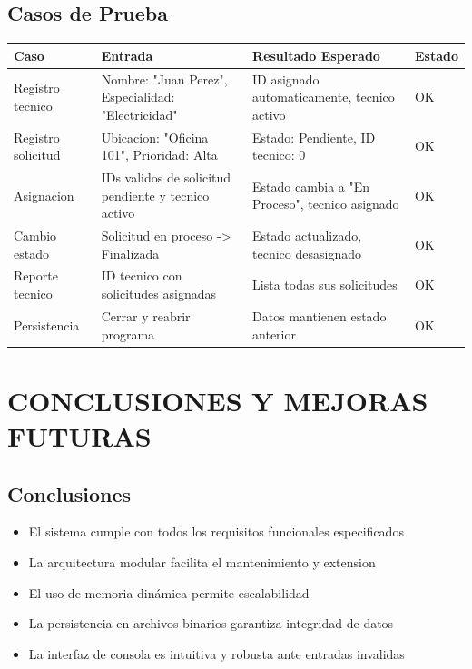 \documentclass[12pt, a4paper]{article}
\begin{document}
\subsection{Casos de Prueba}
\begin{tabular}{|p{3cm}|p{4cm}|p{4cm}|p{2cm}|}
\hline
\textbf{Caso} & \textbf{Entrada} & \textbf{Resultado Esperado} & \textbf{Estado} \\
\hline
Registro tecnico & Nombre: "Juan Perez", Especialidad: "Electricidad" & ID asignado automaticamente, tecnico activo & OK \\
\hline
Registro solicitud & Ubicacion: "Oficina 101", Prioridad: Alta & Estado: Pendiente, ID tecnico: 0 & OK \\
\hline
Asignacion & IDs validos de solicitud pendiente y tecnico activo & Estado cambia a "En Proceso", tecnico asignado & OK \\
\hline
Cambio estado & Solicitud en proceso -> Finalizada & Estado actualizado, tecnico desasignado & OK \\
\hline
Reporte tecnico & ID tecnico con solicitudes asignadas & Lista todas sus solicitudes & OK \\
\hline
Persistencia & Cerrar y reabrir programa & Datos mantienen estado anterior & OK \\
\hline
\end{tabular}

\section{CONCLUSIONES Y MEJORAS FUTURAS}

\subsection{Conclusiones}
\begin{itemize}[left=0pt]
\item El sistema cumple con todos los requisitos funcionales especificados
\item La arquitectura modular facilita el mantenimiento y extension
\item El uso de memoria dinámica permite escalabilidad
\item La persistencia en archivos binarios garantiza integridad de datos
\item La interfaz de consola es intuitiva y robusta ante entradas invalidas
\end{itemize}
\end{document}
